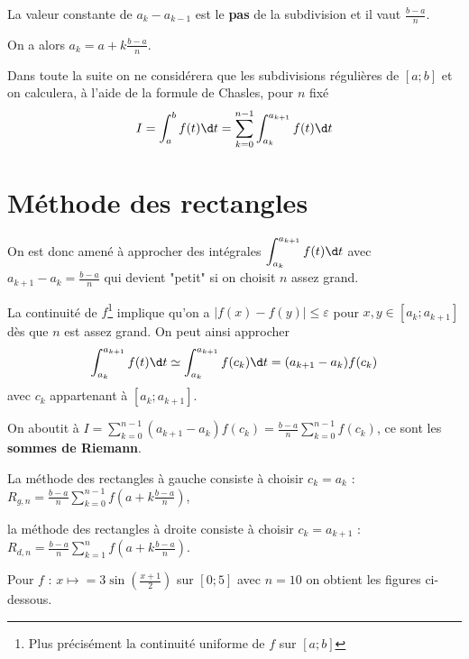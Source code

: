 La valeur constante de $a_k-a_{k-1}$ est le {\bf pas}  de la subdivision et il vaut
$\displaystyle \frac{b-a}n$. 

On a alors $\displaystyle a_k = a + k\frac{b-a}n$.

Dans toute la suite on ne considérera que les subdivisions régulières de $[a;b]$ et on calculera, à l'aide de la formule de Chasles, pour $n$ fixé
\[I = \int_a^b f(t) \d t=\sum_{k=0}^{n-1}\int_{a_k}^{a_{k+1}} f(t)\d t\]

\newpage
\section{Méthode des rectangles}
On est donc amené à approcher des intégrales $\displaystyle \int_{a_k}^{a_{k+1}} f(t)\d t$ avec $a_{k+1} - a_k = \frac{b-a}n$ qui devient "petit" si on choisit $n$ assez grand.

La continuité de $f$\footnote{Plus précisément la continuité uniforme de $f$ sur $[a;b]$} implique qu'on a $|f(x)-f(y)|\le \varepsilon$ pour $x, y \in [a_k;a_{k+1}]$ dès que $n$ est assez grand. On peut ainsi approcher 
\[\int_{a_k}^{a_{k+1}} f(t)\d t \simeq \int_{a_k}^{a_{k+1}} f(c_k)\d t = (a_{k+1} - a_k)f(c_k)\]
avec $c_k$ appartenant à $[a_k;a_{k+1}]$.

On aboutit à $\displaystyle I = \sum_{k=0}^{n-1} (a_{k+1} - a_k)f(c_k)
=\frac{b-a}{n}\sum_{k=0}^{n-1} f(c_k)$, ce sont les {\bf sommes de Riemann}.

La méthode des rectangles à gauche consiste à choisir $c_k=a_k$ : $\displaystyle R_{g, n}= \frac{b-a}{n} \sum_{k=0}^{n-1} f\left(a+k\frac{b-a}{n}\right)$,

la méthode des rectangles à droite consiste à choisir $c_k=a_{k+1}$  : $\displaystyle R_{d, n}= \frac{b-a}{n} \sum_{k=1}^{n} f\left(a+k\frac{b-a}{n}\right)$.

Pour $f$ : $x\mapsto = 3\sin\left(\frac{x+1}2\right)$ sur $[0;5]$ avec $n=10$ on obtient les figures ci-dessous. 


